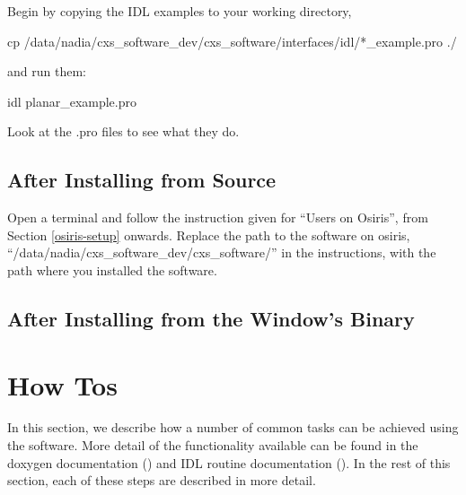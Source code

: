 \documentclass[]{cxs-software}
\begin{document}
Begin by copying the IDL examples to your working directory, 
\begin{myverbatim}
cp /data/nadia/cxs_software_dev/cxs_software/interfaces/idl/*_example.pro ./ 
\end{myverbatim}
and run them: 
\begin{myverbatim}
idl planar_example.pro
\end{myverbatim}

Look at the .pro files to see what they do. 


\subsection{After Installing from Source}

Open a terminal and follow the instruction given for ``Users on
Osiris'', from Section \ref{osiris-setup} onwards. Replace the path to
the software on osiris,
``/data/nadia/cxs\_software\_dev/cxs\_software/'' in the instructions,
with the path where you installed the software.

\subsection{After Installing from the Window's Binary}





\section{How Tos}
\label{how to}

In this section, we describe how a number of common tasks can be
achieved using the software. More detail of the functionality
available can be found in the doxygen documentation () and IDL routine
documentation (). In the rest of this section, each of these steps are
described in more detail.
\end{document}
